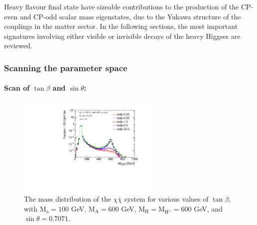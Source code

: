 







Heavy flavour final state have sizeable contributions to the production of the CP-even and CP-odd scalar mass eigenstates, due to the Yukawa structure 
of the couplings in the matter sector. 
In the following sections,  the most important signatures involving either visible or invisible decays of the heavy Higgses are reviewed. 


\subsubsection{Scanning the parameter space}

\paragraph{Scan of $\tan\beta$ and $\sin\theta$:}

\begin{figure}
  \centering
  \includegraphics[width=0.6\textwidth]{texinputs/04_grid/figures/DMHF/benchmarking/MDM_1_Ma_100_MA_600_sinp_0.7071_SCAN_tanb_decayed/mchichi.pdf}
  \caption{The mass distribution of the $\chi \bar{\chi}$ system for various values of $\tan\beta$, with $\mathrm{M_a}=100$ GeV, $\mathrm{M_A}=600$ GeV, $\mathrm{M_H}=\mathrm{M_{H^{\pm}}}=600$ GeV, and $\sin\theta=0.7071$.}
  \label{fig:mchichi_tanB}
\end{figure}

